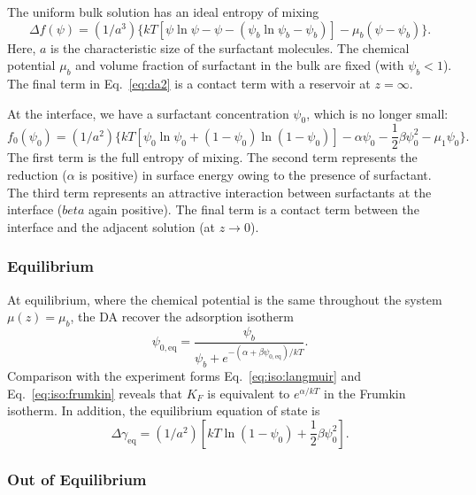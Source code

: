 The uniform bulk solution has an ideal entropy of mixing
\begin{equation}
\Delta f(\psi) = (1/a^3)
\big\{ kT[\psi \ln\psi - \psi - (\psi_b \ln\psi_b - \psi_b)]
- \mu_b (\psi - \psi_b) \big\}.
\label{eq:da2}
\end{equation}
Here, $a$ is the characteristic size of the surfactant molecules.
The chemical potential $\mu_b$ and volume fraction of surfactant
in the bulk are fixed (with $\psi_b < 1$). The final term in
Eq.~\ref{eq:da2} is a contact term with a reservoir at $z = \infty$.

At the interface, we have a surfactant concentration $\psi_0$, which
is no longer small:
\begin{equation}
f_0 (\psi_0) = (1/a^2) \big\{
kT [ \psi_0 \ln\psi_0 + (1 - \psi_0) \ln(1 - \psi_0)]
- \alpha\psi_0 - {\textstyle\frac{1}{2}}\beta\psi_0^2 - \mu_1\psi_0 \big\}.
\end{equation} 
The first term is the full entropy of mixing. The second term represents
the reduction ($\alpha$ is positive) in surface energy owing to the
presence of surfactant. The third term represents an attractive
interaction between surfactants at the interface ($beta$ again positive).
The final term is a contact term between the interface and the adjacent
solution (at $z\rightarrow 0$).

\subsubsection{Equilibrium}

At equilibrium, where the chemical potential is the same throughout
the system $\mu (z) = \mu_b$, the DA recover the adsorption isotherm
\begin{equation}
\psi_{0,\mathrm{eq}} = \frac{\psi_b}{\psi_b
+ e^{-(\alpha + \beta\psi_{0,\mathrm{eq}})/kT}}.
\label{eq:iso:diamant}
\end{equation}
Comparison with the experiment forms Eq.~\ref{eq:iso:langmuir} and
Eq.~\ref{eq:iso:frumkin} reveals that $K_F$ is equivalent to
$e^{\alpha /kT}$ in the Frumkin isotherm. In addition, the equilibrium
equation of state is
\begin{equation}
\Delta \gamma_{\mathrm{eq}} = (1/a^2) [ kT \ln (1 - \psi_0) 
+ {\textstyle\frac{1}{2}}\beta \psi_0^2 ].
\end{equation}

\subsubsection{Out of Equilibrium}


